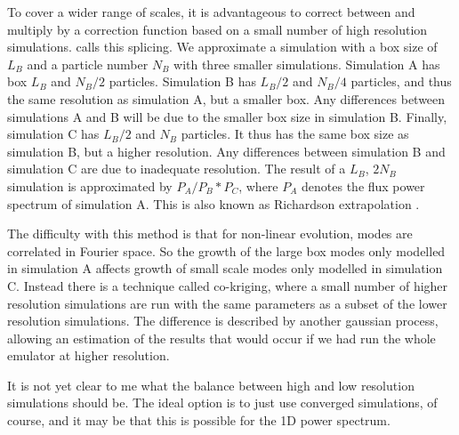 \documentclass[10pt, aps, prd]{revtex4-1}
\begin{document}
To cover a wider range of scales, it is advantageous to correct between 
and multiply by a correction function based on a small number of high resolution simulations. \cite{McDonald:2005pk} calls this splicing. 
We approximate a simulation with a box size of $L_B$ and a particle number $N_B$ with three smaller simulations. Simulation A has 
box $L_B$ and $N_B/2$ particles. Simulation B has $L_B/2$ and $N_B/4$ particles, and thus the same resolution as simulation A, but a smaller box. 
Any differences between simulations A and B will be due to the smaller box size in simulation B. Finally, simulation C has $L_B/2$ and $N_B$ particles. 
It thus has the same box size as simulation B, but a higher resolution. Any differences between simulation B and simulation C are due to inadequate 
resolution. The result of a $L_B$, $2 N_B$ simulation is approximated by $P_A / P_B * P_C$, where $P_A$ denotes the flux power spectrum of simulation A.
This is also known as Richardson extrapolation \cite{Lukic:2015}.

The difficulty with this method is that for non-linear evolution, modes are correlated in Fourier space. So the growth of the large box modes only modelled 
in simulation A affects growth of small scale modes only modelled in simulation C. Instead there is a technique called co-kriging, where a small number 
of higher resolution simulations are run with the same parameters as a subset of the lower resolution simulations. The difference is described by 
another gaussian process, allowing an estimation of the results that would occur if we had run the whole emulator at higher resolution.

It is not yet clear to me what the balance between high and low resolution simulations should be.
The ideal option is to just use converged simulations, of course, and it may be that this is possible for the 1D power spectrum.
\end{document}
